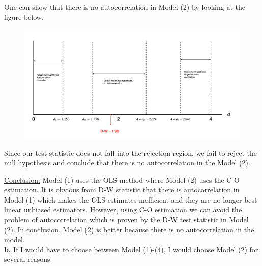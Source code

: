 \documentclass{article}
\begin{document}
One can show that there is no autocorrelation in Model (2) by looking at the figure below. 

\begin{figure}[h]
    \centering
    \includegraphics[scale=0.3]{D-W Figure.png}
\end{figure}

Since our test statistic does not fall into the rejection region, we fail to reject the null hypothesis and conclude that there is no autocorrelation in the Model (2).

\newpage

\underline{Conclusion:} Model (1) uses the OLS method where Model (2) uses the C-O estimation. It is obvious from D-W statistic that there is autocorrelation in Model (1) which makes the OLS estimates inefficient and they are no longer best linear unbiased estimators. However, using C-O estimation we can avoid the problem of autocorrelation which is proven by the D-W test statistic in Model (2). In conclusion, Model (2) is better because there is no autocorrelation in the model.
\\



\textbf{b.} If I would have to choose between Model (1)-(4), I would choose Model (2) for several reasons:
\end{document}
